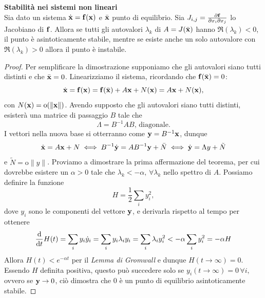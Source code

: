     \begin{theorem}
    \textbf{Stabilità nei sistemi non lineari}\\
     Sia dato un sistema $\dot{\mathbf{x}} = \mathbf{f}(\mathbf{x})$ e $\bar{\mathbf{x}}$ punto di equilibrio. Sia $J_{i,j} = \frac{\partial \mathbf{f}}{\partial x_i\partial x_j}$ lo Jacobiano di $\mathbf{f}$. Allora se tutti gli autovalori $\lambda_k$ di $A=J(\bar{\mathbf{x}})$ hanno $\Re(\lambda_k)< 0$, il punto è asintoticamente stabile, mentre se esiste anche un solo autovalore con $\Re(\lambda_k)>0$ allora il punto è instabile. 
    \end{theorem}
    \begin{proof}
        Per semplificare la dimostrazione supponiamo che gli autovalori siano tutti distinti e che $\bar{\mathbf{x}}=0$. Linearizziamo il sistema, ricordando che $\mathbf{f}(\bar{\mathbf{x}}) = 0$:
        \begin{equation}
            \dot{\mathbf{x}} = \mathbf{f}(\mathbf{x}) = \mathbf{f}(\bar{\mathbf{x}}) + A\mathbf{x} + N(\mathbf{x}) = A\mathbf{x} + N(\mathbf{x}),
        \end{equation}
        con $N(\mathbf{x}) = \mathrm{o}(\|\mathbf{x}\|)$. Avendo supposto che gli autovalori siano tutti distinti, esisterà una matrice di passaggio $B$ tale che
        \begin{equation}
            \Lambda = B^{-1}AB,\,\mathrm{diagonale}.
        \end{equation} 
        I vettori nella nuova base si otterranno come $\mathbf{y} = B^{-1}\mathbf{x}$, dunque
        \begin{equation}
            \dot{\mathbf{x}} = A\mathbf{x} + N \iff B^{-1}\dot{\mathbf{y}} = AB^{-1}\mathbf{y} + \bar{N} \iff \dot{\mathbf{y}} = \Lambda y + \tilde{N} 
        \end{equation}
        e $\tilde{N} = \mathrm{o}\|y\|$. Proviamo a dimostrare la prima affermazione del teorema, per cui dovrebbe esistere un $\alpha>0$ tale che $\lambda_k <-\alpha,\, \forall \lambda_k$ nello spettro di $A$. Possiamo definire la funzione
        \begin{equation}
        H = \frac{1}{2}\sum_{i} y_i^2,
        \end{equation}
        dove $y_i$ sono le componenti del vettore $\mathbf{y}$, e derivarla rispetto al tempo per ottenere
        \begin{equation}
            \frac{\mathrm{d}}{\mathrm{d}t} H(t) = \sum_i y_i \dot{y}_i = \sum_i y_i \lambda_i y_i = \sum_i \lambda_i y_i^2 < -\alpha \sum_i y_i^2 = -\alpha H
        \end{equation}
        Allora $H(t) < e^{-\alpha t}$ per il \emph{Lemma di Gromwall} e dunque $H(t\to \infty) = 0.$ Essendo $H$ definita positiva, questo può succedere solo se $y_i(t\to \infty) = 0\, \forall i,$ ovvero se $\mathbf{y} \to 0$, ciò dimostra che $0$ è un punto di equilibrio asintoticamente stabile.


\end{proof}

